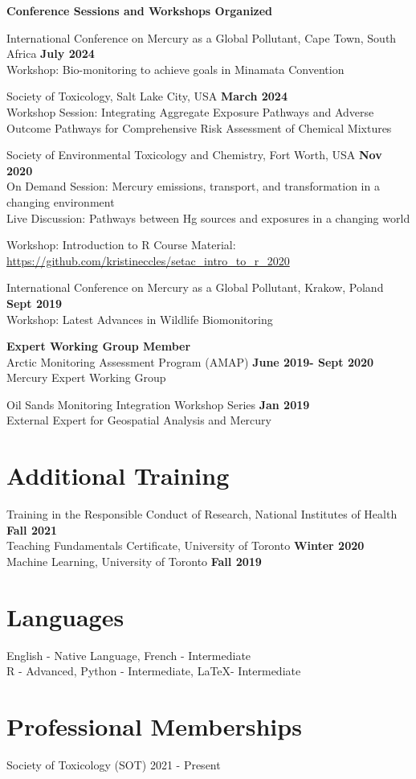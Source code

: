 \documentclass[margin,line]{res}
\begin{document}
\begin{resume}
{\bf Conference Sessions and Workshops Organized}

International Conference on Mercury as a Global Pollutant, Cape Town, South Africa \hfill {\bf July 2024}\\
Workshop: Bio-monitoring to achieve goals in Minamata Convention

Society of Toxicology, Salt Lake City, USA \hfill {\bf  March 2024}\\
Workshop Session: Integrating Aggregate Exposure Pathways and Adverse Outcome Pathways for Comprehensive Risk Assessment of Chemical Mixtures

Society of Environmental Toxicology and Chemistry, Fort Worth, USA \hfill {\bf  Nov 2020}\\
On Demand Session: Mercury emissions, transport, and transformation in a changing environment\\
Live Discussion: Pathways between Hg sources and exposures in a changing world

Workshop: Introduction to R
Course Material: \url{https://github.com/kristineccles/setac_intro_to_r_2020}

International Conference on Mercury as a Global Pollutant, Krakow, Poland \hfill {\bf Sept 2019}\\
Workshop: Latest Advances in Wildlife Biomonitoring

{\bf Expert Working Group Member}\\
Arctic Monitoring Assessment Program (AMAP)
\hfill {\bf  June 2019- Sept 2020}\\
Mercury Expert Working Group

Oil Sands Monitoring Integration Workshop Series
\hfill {\bf  Jan 2019}\\
External Expert for Geospatial Analysis and Mercury

\vspace*{.1in}

\section{\sc Additional Training}
Training in the Responsible Conduct of Research, National Institutes of Health \hfill {\bf  Fall 2021}\\
Teaching Fundamentals Certificate, University of Toronto
\hfill {\bf  Winter 2020}\\
Machine Learning, University of Toronto
\hfill {\bf  Fall 2019}

\vspace*{.1in}

\section{\sc Languages}

English - Native Language, French - Intermediate\\
R - Advanced, Python - Intermediate, LaTeX- Intermediate

\vspace*{.1in}

\section{\sc Professional Memberships}
Society of Toxicology (SOT) 2021 - Present

\end{resume}
\end{document}

